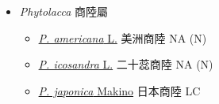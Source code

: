 
  \begin{itemize}
 \item[] \textit{Phytolacca} 商陸屬
                                
  \begin{itemize}
        \item[] \href{http://www.theplantlist.org/tpl1.1/search?q=Phytolacca+americana}{\textit{P. americana} L.}   美洲商陸   NA (N)
        \item[] \href{http://www.theplantlist.org/tpl1.1/search?q=Phytolacca+icosandra}{\textit{P. icosandra} L.}   二十蕊商陸   NA (N)
        \item[] \href{http://www.theplantlist.org/tpl1.1/search?q=Phytolacca+japonica}{\textit{P. japonica} Makino}   日本商陸   LC
  \end{itemize}
  \end{itemize}

